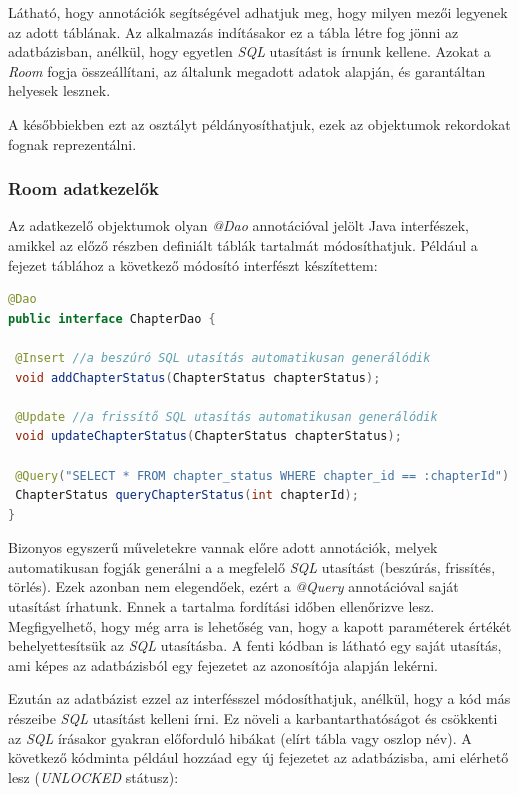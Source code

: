 \documentclass[12pt,a4paper]{article}
\begin{document}
	Látható, hogy annotációk segítségével adhatjuk meg, hogy milyen mezői legyenek az adott táblának. Az alkalmazás indításakor ez a tábla létre fog jönni az adatbázisban, anélkül, hogy egyetlen \textit{SQL} utasítást is írnunk kellene. Azokat a \textit{Room} fogja összeállítani, az általunk megadott adatok alapján, és garantáltan helyesek lesznek.
	
	A későbbiekben ezt az osztályt példányosíthatjuk, ezek az objektumok rekordokat fognak reprezentálni.

	\subsubsection{Room adatkezelők}
	
	Az adatkezelő objektumok olyan \textit{@Dao} annotációval jelölt Java interfészek, amikkel az előző részben definiált táblák tartalmát módosíthatjuk. Például a fejezet táblához a következő módosító interfészt készítettem:
	
	\begin{lstlisting}[language=Java]
@Dao
public interface ChapterDao {
	
 @Insert //a beszúró SQL utasítás automatikusan generálódik
 void addChapterStatus(ChapterStatus chapterStatus);
	
 @Update //a frissítő SQL utasítás automatikusan generálódik
 void updateChapterStatus(ChapterStatus chapterStatus);
	
 @Query("SELECT * FROM chapter_status WHERE chapter_id == :chapterId")
 ChapterStatus queryChapterStatus(int chapterId);
}
	\end{lstlisting}

	Bizonyos egyszerű műveletekre vannak előre adott annotációk, melyek automatikusan fogják generálni a a megfelelő \textit{SQL} utasítást (beszúrás, frissítés, törlés). Ezek azonban nem elegendőek, ezért a \textit{@Query} annotációval saját utasítást írhatunk. Ennek a tartalma fordítási időben ellenőrizve lesz. Megfigyelhető, hogy még arra is lehetőség van, hogy a kapott paraméterek értékét behelyettesítsük az \textit{SQL} utasításba. A fenti kódban is látható egy saját utasítás, ami képes az adatbázisból egy fejezetet az azonosítója alapján lekérni.

	Ezután az adatbázist ezzel az interfésszel módosíthatjuk, anélkül, hogy a kód más részeibe \textit{SQL} utasítást kelleni írni. Ez növeli a karbantarthatóságot és 
	csökkenti az \textit{SQL} írásakor gyakran előforduló hibákat (elírt tábla vagy oszlop név). A következő kódminta például hozzáad egy új fejezetet az adatbázisba, ami elérhető lesz (\textit{UNLOCKED} státusz):
	
\end{document}
